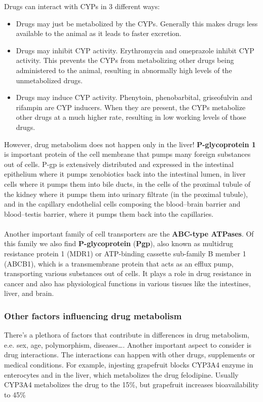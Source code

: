 \documentclass{book}
\begin{document}
Drugs can interact with CYPs in 3 different ways:

\begin{itemize}
    \item Drugs may just be metabolized by the CYPs. Generally this makes drugs less available to the animal as it leads to faster excretion.
    \item Drugs may inhibit CYP activity. Erythromycin and omeprazole inhibit CYP activity. This prevents the CYPs from metabolizing other drugs being administered to the animal, resulting in abnormally high levels of the unmetabolized drugs.
    \item Drugs may induce CYP activity. Phenytoin, phenobarbital, griseofulvin and rifampin are CYP inducers. When they are present, the CYPs metabolize other drugs at a much higher rate, resulting in low working levels of those drugs.
\end{itemize}

However, drug metabolism does not happen only in the liver! 
\textbf{P-glycoprotein 1} is important protein of the cell membrane that pumps many foreign substances out of cells.
P-gp is extensively distributed and expressed in the intestinal epithelium where it pumps xenobiotics back into the intestinal lumen, in liver cells where it pumps them into bile ducts, in the cells of the proximal tubule of the kidney where it pumps them into urinary filtrate (in the proximal tubule), and in the capillary endothelial cells composing the blood–brain barrier and blood–testis barrier, where it pumps them back into the capillaries.
\\
\\
Another important family of cell transporters are the \textbf{ABC-type ATPases}.
Of this family we also find \textbf{P-glycoprotein} (\textbf{Pgp}), also known as multidrug resistance protein 1 (MDR1) or ATP-binding cassette sub-family B member 1 (ABCB1), which is a transmembrane protein that acts as an efflux pump, transporting various substances out of cells.
It plays a role in drug resistance in cancer and also has physiological functions in various tissues like the intestines, liver, and brain. 

\subsubsection{Other factors influencing drug metabolism}
There's a plethora of factors that contribute in differences in drug metabolism, e.e. sex, age, polymorphism, diseases\dots.
Another important aspect to consider is drug interactions.
The interactions can happen with other drugs, supplements or medical conditions.
For example, injesting grapefruit blocks CYP3A4 enzyme in enterocytes and in the liver, which metabolizes the drug felodipine.
Usually CYP3A4 metabolizes the drug to the 15\%, but grapefruit increases bioavailability to 45\%
\end{document}
